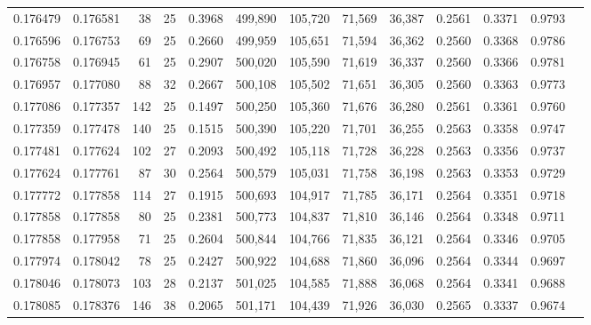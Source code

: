 \begin{tabular}{rrrrrrrrrrrrr}
0.176479 & 0.176581 &    38 &  25 &                                     0.3968 & 499,890 & 105,720 &  71,569 &  36,387 & 0.2561 & 0.3371 & 0.9793 \\
0.176596 & 0.176753 &    69 &  25 &                                     0.2660 & 499,959 & 105,651 &  71,594 &  36,362 & 0.2560 & 0.3368 & 0.9786 \\
0.176758 & 0.176945 &    61 &  25 &                                     0.2907 & 500,020 & 105,590 &  71,619 &  36,337 & 0.2560 & 0.3366 & 0.9781 \\
0.176957 & 0.177080 &    88 &  32 &                                     0.2667 & 500,108 & 105,502 &  71,651 &  36,305 & 0.2560 & 0.3363 & 0.9773 \\
0.177086 & 0.177357 &   142 &  25 &                                     0.1497 & 500,250 & 105,360 &  71,676 &  36,280 & 0.2561 & 0.3361 & 0.9760 \\
0.177359 & 0.177478 &   140 &  25 &                                     0.1515 & 500,390 & 105,220 &  71,701 &  36,255 & 0.2563 & 0.3358 & 0.9747 \\
0.177481 & 0.177624 &   102 &  27 &                                     0.2093 & 500,492 & 105,118 &  71,728 &  36,228 & 0.2563 & 0.3356 & 0.9737 \\
0.177624 & 0.177761 &    87 &  30 &                                     0.2564 & 500,579 & 105,031 &  71,758 &  36,198 & 0.2563 & 0.3353 & 0.9729 \\
0.177772 & 0.177858 &   114 &  27 &                                     0.1915 & 500,693 & 104,917 &  71,785 &  36,171 & 0.2564 & 0.3351 & 0.9718 \\
0.177858 & 0.177858 &    80 &  25 &                                     0.2381 & 500,773 & 104,837 &  71,810 &  36,146 & 0.2564 & 0.3348 & 0.9711 \\
0.177858 & 0.177958 &    71 &  25 &                                     0.2604 & 500,844 & 104,766 &  71,835 &  36,121 & 0.2564 & 0.3346 & 0.9705 \\
0.177974 & 0.178042 &    78 &  25 &                                     0.2427 & 500,922 & 104,688 &  71,860 &  36,096 & 0.2564 & 0.3344 & 0.9697 \\
0.178046 & 0.178073 &   103 &  28 &                                     0.2137 & 501,025 & 104,585 &  71,888 &  36,068 & 0.2564 & 0.3341 & 0.9688 \\
0.178085 & 0.178376 &   146 &  38 &                                     0.2065 & 501,171 & 104,439 &  71,926 &  36,030 & 0.2565 & 0.3337 & 0.9674 \\

\end{tabular}
